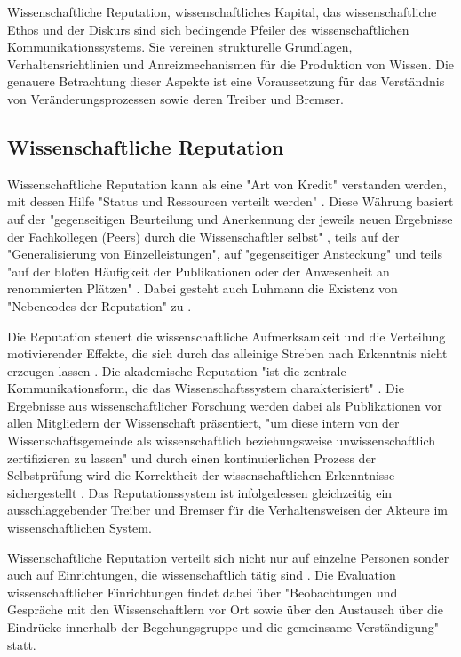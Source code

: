 Wissenschaftliche Reputation, wissenschaftliches Kapital, das wissenschaftliche Ethos und der Diskurs sind sich bedingende Pfeiler des wissenschaftlichen Kommunikationssystems. Sie vereinen strukturelle Grundlagen, Verhaltensrichtlinien und Anreizmechanismen für die Produktion von Wissen. Die genauere Betrachtung dieser Aspekte ist eine Voraussetzung für das Verständnis von Veränderungsprozessen sowie deren Treiber und Bremser.

\subsection{Wissenschaftliche Reputation}

Wissenschaftliche Reputation kann als eine "Art von Kredit" \cite{luhmann_1970_selbststeuerung} verstanden werden, mit dessen Hilfe "Status und Ressourcen verteilt werden" \cite{hanekop_2006}. Diese Währung basiert auf der "gegenseitigen Beurteilung und Anerkennung der jeweils neuen Ergebnisse der Fachkollegen (Peers) durch die Wissenschaftler selbst" \cite{Hanekop_2014} \cite{Neidhardt_2006}, teils auf der "Generalisierung von Einzelleistungen", auf "gegenseitiger Ansteckung" und teils "auf der bloßen Häufigkeit der Publikationen oder der Anwesenheit an renommierten Plätzen" \cite{luhmann_1970_selbststeuerung}. Dabei gesteht auch Luhmann die Existenz von "Nebencodes der Reputation" zu \cite{schmoch_2003_hochschulforschung}.

Die Reputation steuert die wissenschaftliche Aufmerksamkeit und die Verteilung motivierender Effekte, die sich durch das alleinige Streben nach Erkenntnis nicht erzeugen lassen \cite{Luhmann1998}. Die akademische Reputation "ist die zentrale Kommunikationsform, die das Wissenschaftssystem charakterisiert" \cite{Rutenfranz_1997}. Die Ergebnisse aus wissenschaftlicher Forschung werden dabei als Publikationen vor allen Mitgliedern der Wissenschaft präsentiert, "um diese intern von der Wissenschaftsgemeinde als wissenschaftlich beziehungsweise unwissenschaftlich zertifizieren zu lassen" \cite{Rutenfranz_1997} und durch einen kontinuierlichen Prozess der Selbstprüfung wird die Korrektheit der wissenschaftlichen Erkenntnisse sichergestellt \cite{edsall_1976_scientific}. Das Reputationssystem ist infolgedessen gleichzeitig ein ausschlaggebender Treiber und Bremser für die Verhaltensweisen der Akteure im wissenschaftlichen System.

Wissenschaftliche Reputation verteilt sich nicht nur auf einzelne Personen sonder auch auf Einrichtungen, die wissenschaftlich tätig sind \cite[:13]{buss2001wissen}. Die Evaluation wissenschaftlicher Einrichtungen findet dabei über "Beobachtungen und Gespräche mit den Wissenschaftlern vor Ort sowie über den Austausch über die Eindrücke innerhalb der Begehungsgruppe und die gemeinsame Verständigung" \cite{Barl_sius_2008} statt.

